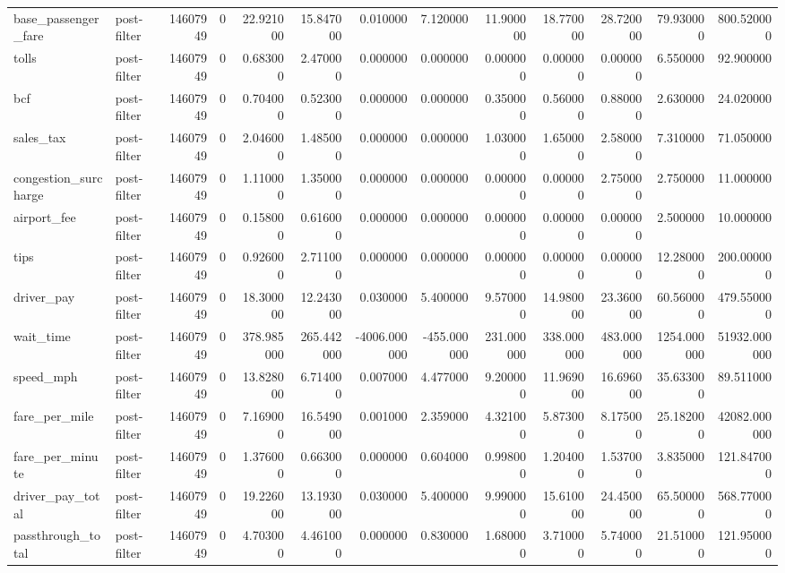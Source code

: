 \begin{longtable}{llrrrrrrrrrrr}
base_passenger_fare & post-filter & 14607949 & 0 & 22.921000 & 15.847000 & 0.010000 & 7.120000 & 11.900000 & 18.770000 & 28.720000 & 79.930000 & 800.520000 \\
tolls & post-filter & 14607949 & 0 & 0.683000 & 2.470000 & 0.000000 & 0.000000 & 0.000000 & 0.000000 & 0.000000 & 6.550000 & 92.900000 \\
bcf & post-filter & 14607949 & 0 & 0.704000 & 0.523000 & 0.000000 & 0.000000 & 0.350000 & 0.560000 & 0.880000 & 2.630000 & 24.020000 \\
sales_tax & post-filter & 14607949 & 0 & 2.046000 & 1.485000 & 0.000000 & 0.000000 & 1.030000 & 1.650000 & 2.580000 & 7.310000 & 71.050000 \\
congestion_surcharge & post-filter & 14607949 & 0 & 1.110000 & 1.350000 & 0.000000 & 0.000000 & 0.000000 & 0.000000 & 2.750000 & 2.750000 & 11.000000 \\
airport_fee & post-filter & 14607949 & 0 & 0.158000 & 0.616000 & 0.000000 & 0.000000 & 0.000000 & 0.000000 & 0.000000 & 2.500000 & 10.000000 \\
tips & post-filter & 14607949 & 0 & 0.926000 & 2.711000 & 0.000000 & 0.000000 & 0.000000 & 0.000000 & 0.000000 & 12.280000 & 200.000000 \\
driver_pay & post-filter & 14607949 & 0 & 18.300000 & 12.243000 & 0.030000 & 5.400000 & 9.570000 & 14.980000 & 23.360000 & 60.560000 & 479.550000 \\
wait_time & post-filter & 14607949 & 0 & 378.985000 & 265.442000 & -4006.000000 & -455.000000 & 231.000000 & 338.000000 & 483.000000 & 1254.000000 & 51932.000000 \\
speed_mph & post-filter & 14607949 & 0 & 13.828000 & 6.714000 & 0.007000 & 4.477000 & 9.200000 & 11.969000 & 16.696000 & 35.633000 & 89.511000 \\
fare_per_mile & post-filter & 14607949 & 0 & 7.169000 & 16.549000 & 0.001000 & 2.359000 & 4.321000 & 5.873000 & 8.175000 & 25.182000 & 42082.000000 \\
fare_per_minute & post-filter & 14607949 & 0 & 1.376000 & 0.663000 & 0.000000 & 0.604000 & 0.998000 & 1.204000 & 1.537000 & 3.835000 & 121.847000 \\
driver_pay_total & post-filter & 14607949 & 0 & 19.226000 & 13.193000 & 0.030000 & 5.400000 & 9.990000 & 15.610000 & 24.450000 & 65.500000 & 568.770000 \\
passthrough_total & post-filter & 14607949 & 0 & 4.703000 & 4.461000 & 0.000000 & 0.830000 & 1.680000 & 3.710000 & 5.740000 & 21.510000 & 121.950000 \\

\end{longtable}
